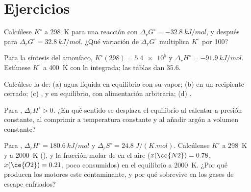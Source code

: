 \section{Ejercicios}

\begin{exercise}[$\star$]\label{exo:b2:equilibrium-shifts:1}
Calcúlese $K^\circ$ a \qty{298}{K} para una reacción con $\Delta_r G^\circ =
\qty{-32.8}{kJ/mol}$, y después para $\Delta_r G^\circ = \qty{+32.8}{kJ/mol}$.
¿Qué variación de $\Delta_r G^\circ$ multiplica $K^\circ$ por 100?
\end{exercise}

\begin{exercise}[$\star$]\label{exo:b2:equilibrium-shifts:2}
Para la síntesis del amoníaco, $K^\circ(298) = \num{5.4e5}$ y $\Delta_r H^\circ =
\qty{-91.9}{kJ/mol}$. Estímese $K^\circ$ a \qty{400}{K} con la  integrada; las tablas dan 35.6.
\end{exercise}

\begin{exercise}[$\star$]\label{exo:b2:equilibrium-shifts:3}
Calcúlese la  de: (a) agua líquida en equilibrio con su vapor;
(b)  en un recipiente cerrado; (c) ,
 y  en equilibrio, con alimentación arbitraria; (d) .
\end{exercise}

\begin{exercise}[$\star$]\label{exo:b2:equilibrium-shifts:4}
Para , $\Delta_r H^\circ > 0$. ¿En qué sentido se desplaza el
equilibrio al calentar a presión constante, al comprimir a
temperatura constante y al añadir argón a volumen constante?
\end{exercise}

\begin{exercise}[$\star\star$]\label{exo:b2:equilibrium-shifts:5}
Para , $\Delta_r H^\circ = \qty{180.6}{kJ/mol}$ y
$\Delta_r S^\circ = \qty{24.8}{J/(K.mol)}$. Calcúlense $K^\circ$ a \qty{298}{K}
y a \qty{2000}{K} (), y la fracción molar de
 en el aire ($x(\ce{N2}) = 0.78$, $x(\ce{O2}) = 0.21$, poco consumidos) en el
equilibrio a \qty{2000}{K}. ¿Por qué producen los motores este contaminante, y por qué
sobrevive en los gases de escape enfriados?
\end{exercise}

